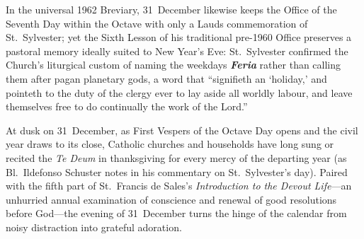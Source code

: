 In the universal 1962 Breviary, 31~December likewise keeps the Office of the
Seventh Day within the Octave with only a Lauds commemoration of St.~Sylvester;
yet the Sixth Lesson of his traditional pre-1960 Office preserves a pastoral
memory ideally suited to New Year's Eve: St.~Sylvester confirmed the Church's
liturgical custom of naming the weekdays \textbf{\textit{Feria}} rather than
calling them after pagan planetary gods, a word that ``signifieth an `holiday,'
and pointeth to the duty of the clergy ever to lay aside all worldly labour,
and leave themselves free to do continually the work of the Lord.''

At dusk on 31~December, as First Vespers of the Octave Day opens and the civil
year draws to its close, Catholic churches and households have long sung or
recited the \textit{Te Deum} in thanksgiving for every mercy of the departing
year (as Bl.~Ildefonso Schuster notes in his commentary on St.~Sylvester's
day). Paired with the fifth part of St.~Francis de Sales's \textit{Introduction
to the Devout Life}---an unhurried annual examination of conscience and renewal
of good resolutions before God---the evening of 31~December turns the hinge of
the calendar from noisy distraction into grateful adoration.
